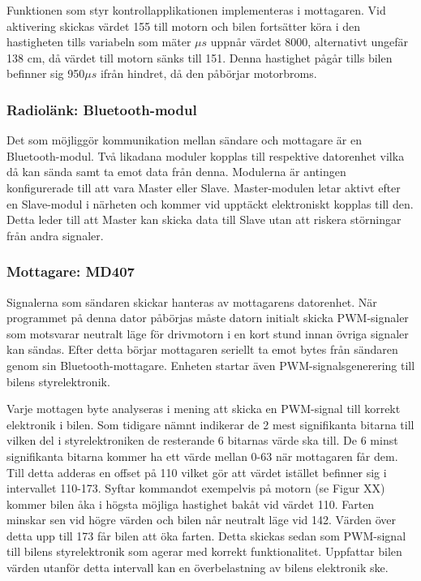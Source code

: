 \documentclass[a4paper]{article}
\begin{document}
Funktionen som styr kontrollapplikationen implementeras i mottagaren. Vid aktivering skickas värdet 155 till motorn  och bilen fortsätter köra i den hastigheten tills variabeln som mäter $\mu s$ uppnår värdet 8000, alternativt ungefär 138 cm, då värdet till motorn sänks till 151. Denna hastighet pågår tills bilen befinner sig 950$\mu s$ ifrån hindret, då den påbörjar motorbroms.


\subsubsection{Radiolänk: Bluetooth-modul}
Det som möjliggör kommunikation mellan sändare och mottagare är en Bluetooth-modul. Två likadana moduler kopplas till respektive datorenhet vilka då kan sända samt ta emot data från denna. Modulerna är antingen konfigurerade till att vara Master eller Slave. Master-modulen letar aktivt efter en Slave-modul i närheten och kommer vid upptäckt elektroniskt kopplas till den. Detta leder till att Master kan skicka data till Slave utan att riskera störningar från andra signaler.


\subsubsection{Mottagare: MD407}
Signalerna som sändaren skickar hanteras av mottagarens datorenhet. När programmet på denna dator påbörjas måste datorn initialt skicka PWM-signaler som motsvarar neutralt läge för drivmotorn i en kort stund innan övriga signaler kan sändas. Efter detta börjar mottagaren seriellt ta emot bytes från sändaren genom sin Bluetooth-mottagare. Enheten startar även PWM-signalsgenerering till bilens styrelektronik. 

\vspace{5mm} \noindent
Varje mottagen byte analyseras i mening att skicka en PWM-signal till korrekt elektronik i bilen. Som tidigare nämnt indikerar de 2 mest signifikanta bitarna till vilken del i styrelektroniken de resterande 6 bitarnas värde ska till. De 6 minst signifikanta bitarna kommer ha ett värde mellan 0-63 när mottagaren får dem. Till detta adderas en offset på 110 vilket gör att värdet istället befinner sig i intervallet 110-173. Syftar kommandot exempelvis på motorn (se Figur XX) kommer bilen åka i högsta möjliga hastighet bakåt vid värdet 110. Farten minskar sen vid högre värden och bilen når neutralt läge vid 142. Värden över detta upp till 173 får bilen att öka farten. Detta skickas sedan som PWM-signal till bilens styrelektronik som agerar med korrekt funktionalitet. Uppfattar bilen värden utanför detta intervall kan en överbelastning av bilens elektronik ske. 
\end{document}
